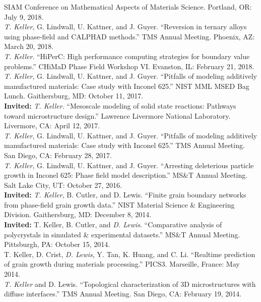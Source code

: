\documentclass[margin]{res}
\begin{document}
\begin{resume}
 SIAM Conference on Mathematical Aspects of Materials Science. Portland, OR: July 9, 2018.\\[0.25\baselineskip]
\textit{T. Keller}, G. Lindwall, U. Kattner, and J. Guyer. ``Reversion in ternary alloys using phase-field and CALPHAD methods.''
 TMS Annual Meeting. Phoenix, AZ: March 20, 2018.\\[0.25\baselineskip]
\textit{T. Keller}. ``HiPerC: High performance computing strategies for boundary value problems.''
 CHiMaD Phase Field Workshop VI. Evanston, IL: February 21, 2018.\\[0.25\baselineskip]
\textit{T. Keller}, G. Lindwall, U. Kattner, and J. Guyer. ``Pitfalls of modeling additively manufactured materials: Case study with Inconel 625.''
 NIST MML MSED Bag Lunch. Gaithersburg, MD: October 11, 2017.\\[0.25\baselineskip]
{\bf Invited:} \textit{T. Keller}. ``Mesoscale modeling of solid state reactions: Pathways toward microstructure design.''
 Lawrence Livermore National Laboratory. Livermore, CA: April 12, 2017.\\[0.25\baselineskip]
\textit{T. Keller}, G. Lindwall, U. Kattner, and J. Guyer. ``Pitfalls of modeling additively manufactured materials: Case study with Inconel 625.''
 TMS Annual Meeting. San Diego, CA: February 28, 2017.\\[0.25\baselineskip]
\textit{T. Keller}, G. Lindwall, U. Kattner, and J. Guyer. ``Arresting deleterious particle growth in Inconel 625: Phase field model description.''
 MS\&T Annual Meeting. Salt Lake City, UT: October 27, 2016.\\[0.25\baselineskip]
{\bf Invited:} \textit{T. Keller}, B. Cutler, and D. Lewis. ``Finite grain boundary networks from phase-field grain growth data.''
 NIST Material Science \& Engineering Division. Gaithersburg, MD: December 8, 2014.\\[0.25\baselineskip]
{\bf Invited:} T. Keller, B. Cutler, and \textit{D. Lewis}. ``Comparative analysis of polycrystals in simulated \& experimental datasets.''
 MS\&T Annual Meeting. Pittsburgh, PA: October 15, 2014.\\[0.25\baselineskip]
T. Keller, D. Crist, \textit{D. Lewis}, Y. Tan, K. Huang, and C. Li. ``Realtime prediction of grain growth during materials processing.''
 PICS3. Marseille, France: May 2014.\\[0.25\baselineskip]
\textit{T. Keller} and D. Lewis. ``Topological characterization of 3D microstructures with diffuse interfaces.'' TMS Annual Meeting. San Diego, CA: February 19, 2014.\\[0.25\baselineskip]

\end{resume}
\end{document}
